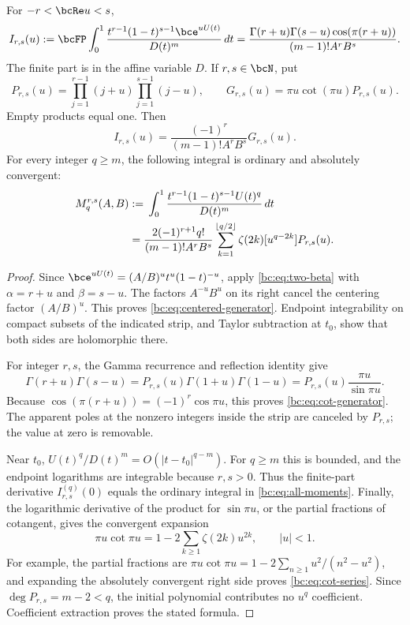 \begin{theorem}
\label{bc:thm:moments}
For $-r<\bcRe u<s$,
\begin{equation}\label{bc:eq:centered-generator}
 I_{r,s}(u):=\bcFP\int_0^1
 \frac{t^{r-1}(1-t)^{s-1}\bce^{uU(t)}}{D(t)^m}\,dt
 =\frac{\Gamma(r+u)\Gamma(s-u)\cos(\pi(r+u))}
        {(m-1)!A^rB^s}.
\end{equation}
The finite part is in the affine variable $D$. If $r,s\in\bcN$, put
\begin{equation}\label{bc:eq:P}
 P_{r,s}(u)=\prod_{j=1}^{r-1}(j+u)
                \prod_{j=1}^{s-1}(j-u),\qquad
 G_{r,s}(u)=\pi u\cot(\pi u)P_{r,s}(u).
\end{equation}
Empty products equal one. Then
\begin{equation}\label{bc:eq:cot-generator}
 I_{r,s}(u)=\frac{(-1)^r}{(m-1)!A^rB^s}G_{r,s}(u).
\end{equation}
For every integer $q\ge m$, the following integral is ordinary and
absolutely convergent:
\begin{align}
 M_q^{r,s}(A,B)
 &:={}\int_0^1\frac{t^{r-1}(1-t)^{s-1}U(t)^q}{D(t)^m}\,dt\notag\\
 &=\frac{2(-1)^{r+1}q!}{(m-1)!A^rB^s}
       \sum_{k=1}^{\lfloor q/2\rfloor}
           \zeta(2k)[u^{q-2k}]P_{r,s}(u).
 \label{bc:eq:all-moments}
\end{align}
\end{theorem}
\begin{proof}
Since
$\bce^{uU(t)}=(A/B)^u t^u(1-t)^{-u}$, apply
\eqref{bc:eq:two-beta} with $\alpha=r+u$ and $\beta=s-u$.
The factors $A^{-u}B^u$ on its right cancel the centering factor
$(A/B)^u$. This proves \eqref{bc:eq:centered-generator}. Endpoint
integrability on compact subsets of the indicated strip, and Taylor
subtraction at $t_0$, show that both sides are holomorphic there.

For integer $r,s$, the Gamma recurrence and reflection identity give
\[
 \Gamma(r+u)\Gamma(s-u)
  =P_{r,s}(u)\Gamma(1+u)\Gamma(1-u)
  =P_{r,s}(u)\frac{\pi u}{\sin\pi u}.
\]
Because $\cos(\pi(r+u))=(-1)^r\cos\pi u$, this proves
\eqref{bc:eq:cot-generator}. The apparent poles at the nonzero integers
inside the strip are canceled by $P_{r,s}$; the value at zero is
removable.

Near $t_0$, $U(t)^q/D(t)^m=O(|t-t_0|^{q-m})$. For $q\ge m$ this is
bounded, and the endpoint logarithms are integrable because $r,s>0$.
Thus the finite-part derivative $I_{r,s}^{(q)}(0)$ equals the ordinary
integral in \eqref{bc:eq:all-moments}. Finally, the logarithmic derivative
of the product for $\sin\pi u$, or the partial fractions of cotangent,
gives the convergent expansion
\begin{equation}\label{bc:eq:cot-series}
 \pi u\cot\pi u=1-2\sum_{k\ge1}\zeta(2k)u^{2k},\qquad |u|<1.
\end{equation}
For example, the partial fractions are
$\pi u\cot\pi u=1-2\sum_{n\ge1}u^2/(n^2-u^2)$, and expanding the
absolutely convergent right side proves \eqref{bc:eq:cot-series}.
Since $\deg P_{r,s}=m-2<q$, the initial polynomial contributes no
$u^q$ coefficient. Coefficient extraction proves the stated formula.
\end{proof}

